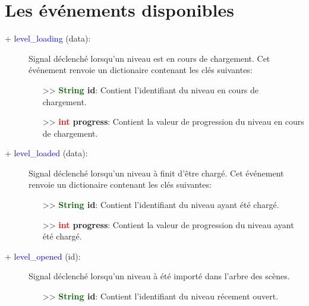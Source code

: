 \documentclass[a4paper, 11pt]{article}
\begin{document}
	\newpage \section{Les événements disponibles}
	\begin{description}
		\item [+ \textcolor{blue}{level\_loading} (data):] Signal déclenché lorsqu'un niveau est en cours de 
		chargement. Cet \\événement renvoie un dictionaire contenant les clés suivantes:
		\begin{itemize}
			\item [>> \textbf{\textcolor{darkgreen}{String} id}:] Contient l'identifiant du niveau en cours
			de chargement.
			\item [>> \textbf{\textcolor{red}{int} progress}:] Contient la valeur de progression du niveau 
			en cours de chargement.\\
		\end{itemize}
	\end{description}
	\begin{description}
		\item [+ \textcolor{blue}{level\_loaded} (data):] Signal déclenché lorsqu'un niveau à finit d'être 
		chargé. Cet événement \\renvoie un dictionaire contenant les clés suivantes:
		\begin{itemize}
			\item [>> \textbf{\textcolor{darkgreen}{String} id}:] Contient l'identifiant du niveau ayant été
			chargé.
			\item [>> \textbf{\textcolor{red}{int} progress}:] Contient la valeur de progression du niveau 
			ayant été chargé.\\
		\end{itemize}
	\end{description}
	\begin{description}
		\item [+ \textcolor{blue}{level\_opened} (id):] Signal déclenché lorsqu'un niveau à été importé dans 
		l'arbre des scènes.
		\begin{itemize}
			\item [>> \textbf{\textcolor{darkgreen}{String} id}:] Contient l'identifiant du niveau récement
			ouvert.\\
		\end{itemize}
	\end{description}
\end{document}
